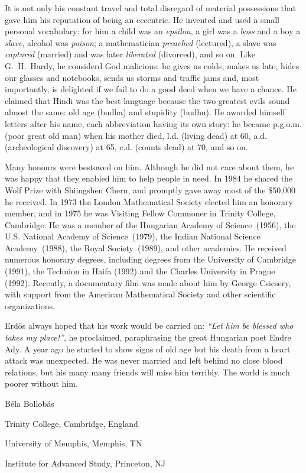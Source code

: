 \documentclass[a6paper]{article}
\begin{document}
It is not only his constant travel and total disregard of material possessions
that gave him his reputation of being an eccentric.
He invented
and used a small personal vocabulary: for him a child was an {\it epsilon}, 
a girl was a {\it boss} and a 
boy a {\it slave}, alcohol was {\it poison}; a mathematician {\it preached} 
(lectured), a slave was {\it captured} (married) and was
later {\it liberated} (divorced), and so on.
Like G.~H.~Hardy, he considerd God 
malicious: he gives us colds, makes us late, hides our glasses and notebooks, 
sends us storms and traffic jams and,
most importantly, is delighted if we fail to do a good deed 
when we have a chance. He claimed 
that Hindi was the best language because the two greatest evils sound 
almost the same: old age (budha) and stupidity (budhu). 
He awarded himself letters after his name, each abbreviation 
having its own story: he became p.g.o.m. (poor
great old man) when his mother died, l.d. (living dead) at 60, a.d. 
(archeological discovery) at 65, c.d. (counts dead) at 70, and so on.

Many honours were bestowed on him. Although he did not care about them, he was
happy that they enabled him to help people in need. 
In 1984 he shared the Wolf Prize with Shiingshen Chern, and promptly gave
away most of the \$50,000 he received.
In 1973 the London Mathematical Society elected him an honorary member,
and in 1975 he was Visiting Fellow Commoner in Trinity College, Cambridge.
He was a member of the Hungarian Academy of Science~(1956), the U.S. National
Academy of Science~(1979), the Indian National Science Academy~(1988), the
Royal Society~(1989), and other academies. 
He received numerous honorary degrees, 
including degrees from the University of Cambridge (1991), the Technion
in Haifa (1992) and the Charles University in Prague (1992). Recently,
a documentary film was made about him by George Csicsery, 
with support from the American Mathematical Society and other scientific 
organizations.

Erd\H{o}s always hoped that his work would be carried on: 
{\it ``Let him be blessed
who takes my place!''}, he proclaimed, paraphrasing the great Hungarian poet 
Endre Ady.
A year ago he started to show signs of old age but his death from a 
heart attack was unexpected. He was never married and left behind no close 
blood relations, but his many many friends will miss him terribly.
The world is much poorer without him.

\vskip 2cm

\hskip 6cm 
B\'ela Bollob\'as

\medskip
\hskip 4cm
Trinity College, Cambridge, England 

\hskip 4cm
University of Memphis, Memphis, TN 

\hskip4cm
Institute for Advanced Study, Princeton, NJ
\end{document}
